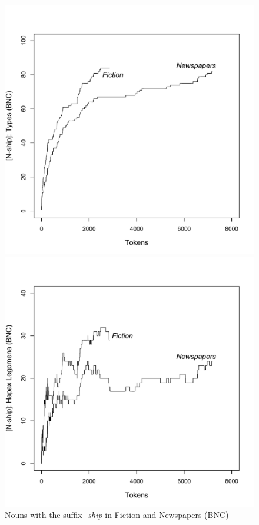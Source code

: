 \begin{figure}
\caption{Nouns with the suffix \textit{-ship} in Fiction and Newspapers (BNC)}
\label{fig:genreshipfullttrhtr}
\begin{minipage}{.5\textwidth}
  \centering
  \includegraphics[width=\textwidth]{figures/genreshipfullttr}
\end{minipage}
%
\begin{minipage}{.5\textwidth}
  \centering
  \includegraphics[width=\textwidth]{figures/genreshipfullhtr}
\end{minipage}
\end{figure}

